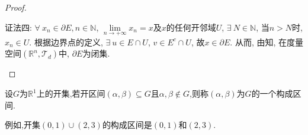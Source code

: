 \documentclass[../../main.tex]{subfiles}%
\begin{document}
\begin{proof}
\begin{enumerate}[(1)]
{\color{blue}证法四:}
$\forall\ x_n \in \partial E, n \in \mathbb{N}$, $\lim\limits_{n \to +\infty} x_n = x$及$x$的任何开邻域$U$, $\exists\ N \in \mathbb{N}$, 当$n > N$时, $x_n \in U$. 根据边界点的定义, $\exists\ u \in E \cap U$, $v \in E^c \cap U$, 故$x \in \partial E$. 从而, 由知, 在度量空间$(\mathbb{R}^n, \mathcal{T}_{d})$中, $\partial E$为闭集.
\end{enumerate}

\end{proof}

\begin{definition}[构成区间]
设$G$为$\mathbb{R}^1$上的开集,若开区间$(\alpha,\beta)\subseteq G$且$\alpha,\beta \notin G$,则称$(\alpha,\beta)$为$G$的一个构成区间.
\end{definition}
\begin{note}
例如,开集$(0,1)\cup (2,3)$的构成区间是$(0,1)$和$(2,3)$.
\end{note}
\end{document}
